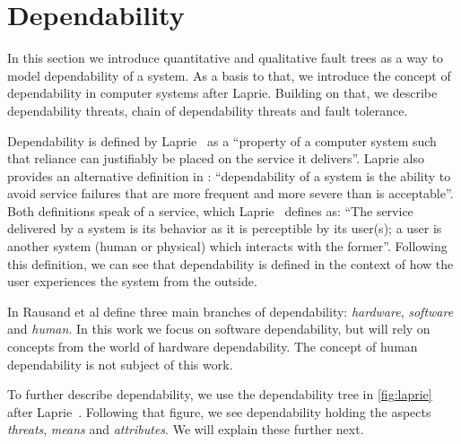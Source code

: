 
\section{Dependability}
\label{sec:dependability}

In this section we introduce quantitative and qualitative fault trees as a way to model dependability of a system. As a basis to that, we introduce the concept of dependability in computer systems after Laprie. Building on that, we describe dependability threats, chain of dependability threats and fault tolerance.

Dependability is defined by Laprie~\cite{Laprie1995} as a ``property of a computer system such that reliance can justifiably be placed on the service it delivers''. Laprie also provides an alternative definition in \cite{Laprie2004}: ``dependability of a system is the ability to avoid service failures that are more frequent and more severe than is acceptable''. Both definitions speak of a service, which Laprie~\cite{Laprie1995} defines as: ``The service delivered by a system is its behavior as it is perceptible by its user(s); a user is another system (human or physical) which interacts with the former''. Following this definition, we can see that dependability is defined in the context of how the user experiences the system from the outside.

In \cite{SysReliabilityTheory} Rausand et al define three main branches of dependability: \emph{hardware}, \emph{software} and \emph{human}. In this work we focus on software dependability, but will rely on concepts from the world of hardware dependability. The concept of human dependability is not subject of this work.

To further describe dependability, we use the dependability tree in \autoref{fig:laprie} after Laprie~\cite{Laprie1995}. Following that figure, we see dependability holding the aspects \emph{threats}, \emph{means} and \emph{attributes}. We will explain these further next.

